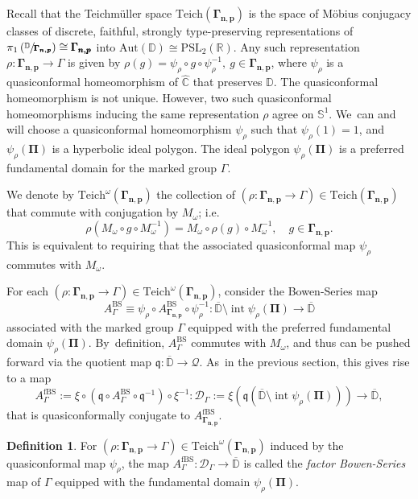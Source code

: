 \documentclass[10pt,a4paper]{amsart}
\newcommand{\ie}{i.e.\ }
\let\faktor\sfrac
\theoremstyle{definition}
\newtheorem{definition}[lemma]{Definition}
\theoremstyle{remark}
\newcommand{\C}{\mathbb{C}}
\newcommand{\D}{\mathbb{D}}
\newcommand{\R}{\mathbb{R}}
\DeclareMathOperator{\Int}{int}
\begin{document}
Recall that the Teichmüller space $\mathrm{Teich}(\pmb{\Gamma_{n,p}})$ is the space of Möbius conjugacy classes of discrete, faithful, strongly type-preserving representations of $\pi_1\left(\faktor{\D}{\pmb{\Gamma_{n,p}}}\right)\cong \pmb{\Gamma_{n,p}}$ into $\mathrm{Aut}(\D)\cong \mathrm{PSL}_2(\R)$. Any such representation $\rho: \pmb{\Gamma_{n,p}}\to\Gamma$ is given by $\rho(g)=\psi_\rho\circ g\circ\psi_\rho^{-1},\ g\in\pmb{\Gamma_{n,p}}$, where $\psi_\rho$ is a quasiconformal homeomorphism of $\widehat{\C}$ that preserves $\D$.
The quasiconformal homeomorphism is not unique. However,
two such quasiconformal homeomorphisms inducing the same representation $\rho$ agree on $\mathbb{S}^1$. We~can and will choose a quasiconformal homeomorphism $\psi_\rho$ such that $\psi_\rho(1)=1$, and $\psi_\rho(\pmb{\Pi})$ is a hyperbolic ideal polygon.
The ideal polygon $\psi_\rho(\pmb{\Pi})$ is a preferred fundamental domain for the marked group $\Gamma$.

We denote by $\mathrm{Teich}^\omega(\pmb{\Gamma_{n,p}})$ the collection of $(\rho: \pmb{\Gamma_{n,p}}\to\Gamma)\in\mathrm{Teich}(\pmb{\Gamma_{n,p}})$ that commute with conjugation by $M_\omega$; \ie
\[
\rho(M_\omega\circ g\circ M_\omega^{-1})=M_\omega\circ \rho(g)\circ M_\omega^{-1},\quad g\in\pmb{\Gamma_{n,p}}.
\]
This is equivalent to requiring that the associated quasiconformal map $\psi_\rho$ commutes with $M_\omega$.

For each $(\rho: \pmb{\Gamma_{n,p}}\to\Gamma)\in \mathrm{Teich}^\omega(\pmb{\Gamma_{n,p}})$, consider the Bowen-Series map
\[
A_{\Gamma}^{\mathrm{BS}} \equiv\psi_\rho\circ A_{\pmb{\Gamma_{n,p}}}^{\mathrm{BS}}\circ\psi_\rho^{-1}:\overline{\D}\setminus \Int{\psi_\rho(\pmb{\Pi})}\to\overline{\D}
\]
associated with the marked group $\Gamma$ equipped with the preferred fundamental domain $\psi_\rho(\pmb{\Pi})$. By~definition, $A_\Gamma^{\mathrm{BS}}$ commutes with $M_\omega$, and thus can be pushed forward via the quotient map $\mathfrak{q}:\overline{\D}\to\mathcal{Q}$. As~in the previous section, this gives rise to a map
\[
A_{\Gamma}^{\mathrm{fBS}}:= \xi\circ \left(\mathfrak{q}\circ A_{\Gamma}^{\mathrm{BS}} \circ\mathfrak{q}^{-1}\right) \circ \xi^{-1}: \mathcal{D}_{\Gamma}:= \xi(\mathfrak{q}(\overline{\D}\setminus \Int{\psi_\rho(\pmb{\Pi})}))\to \overline{\D},
\]
that is quasiconformally conjugate to $A_{\pmb{\Gamma_{n,p}}}^{\mathrm{fBS}}$.

\begin{definition}\label{factor_bs_gen_def}
For $(\rho: \pmb{\Gamma_{n,p}}\to\Gamma)\in \mathrm{Teich}^\omega(\pmb{\Gamma_{n,p}})$ induced by the quasiconformal map $\psi_\rho$, the map $A_{\Gamma}^{\mathrm{fBS}}: \mathcal{D}_{\Gamma}\to \overline{\D}$ is called the \emph{factor Bowen-Series} map of $\Gamma$ equipped with the fundamental domain $\psi_\rho(\pmb{\Pi})$.
\end{definition}
\end{document}

